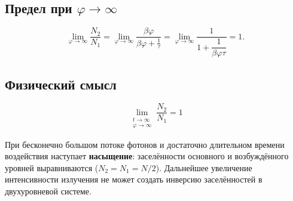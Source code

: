 \documentclass[12pt, a4paper]{article}
\begin{document}
\subsection*{Предел при $\varphi \to \infty$ }

\[
    \lim_{\varphi\to\infty}\frac{N_2}{N_1} = \lim_{\varphi\to\infty}\frac{\beta\varphi}{\beta\varphi + \frac{1}{\tau}} = \lim_{\varphi\to\infty}\frac{1}{1 + \dfrac{1}{\beta\varphi\tau}} = 1.
\]

\subsection*{Физический смысл}

\[
    \boxed{\lim_{\substack{t\to\infty \\ \varphi\to\infty}} \frac{N_2}{N_1} = 1}
\]

При бесконечно большом потоке фотонов и достаточно длительном времени воздействия наступает \textbf{насыщение}: заселённости основного и возбуждённого уровней выравниваются ($N_2 = N_1 = N/2$). Дальнейшее увеличение интенсивности излучения не может создать инверсию заселённостей в двухуровневой системе.













\end{document}
